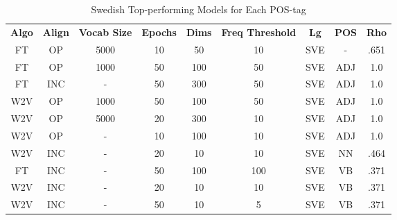 \begin{table}[h]
\centering
\begin{tabular}{ccccccccc} 
\toprule
\textbf{ Algo } & \textbf{ Align } & \textbf{ Vocab Size } & \textbf{ Epochs } & \textbf{ Dims } & \textbf{ Freq Threshold } & \textbf{ Lg } & \textbf{ POS } & \textbf{ Rho }  \\
FT              & OP               & 5000                  & 10                & 50              & 10                        & SVE           & -              & .651            \\
FT              & OP               & 1000                  & 50                & 100             & 50                        & SVE           & ADJ            & 1.0             \\
FT              & INC              & -                     & 50                & 300             & 50                        & SVE           & ADJ            & 1.0             \\
W2V             & OP               & 1000                  & 50                & 100             & 50                        & SVE           & ADJ            & 1.0             \\
W2V             & OP               & 5000                  & 20                & 300             & 10                        & SVE           & ADJ            & 1.0             \\
W2V             & OP               & -                     & 10                & 100             & 10                        & SVE           & ADJ            & 1.0             \\
W2V             & INC              & -                     & 20                & 10              & 10                        & SVE           & NN             & .464            \\
FT              & INC              & -                     & 50                & 100             & 100                       & SVE           & VB             & .371            \\
W2V             & INC              & -                     & 20                & 10              & 10                        & SVE           & VB             & .371            \\
W2V             & INC              & -                     & 50                & 10              & 5                         & SVE           & VB             & .371            \\
\bottomrule
\end{tabular}
\caption{Swedish Top-performing Models for Each POS-tag}
\label{tab:sve-posresults}
\end{table}